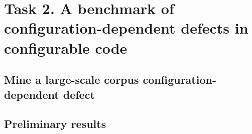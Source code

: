 \section{Task 2. A benchmark of configuration-dependent defects in configurable code}
\label{task2-section}

\subsection{Mine a large-scale corpus configuration-dependent defect}

\subsection{Preliminary results }